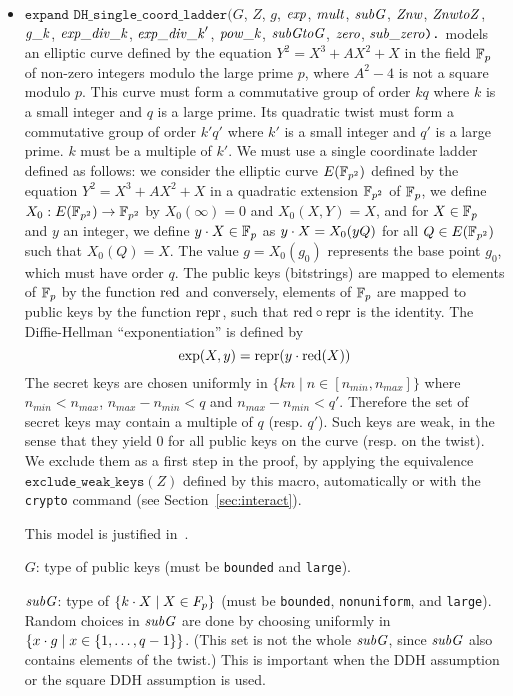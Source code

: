 \documentclass{article}
\begin{document}
\begin{itemize}
\begin{itemize}
\begin{itemize}
     \item $\texttt{expand\ DH\_single\_coord\_ladder}(G$, $Z$, $g$, $\mathit{exp}$, $\mathit{mult}$, $\mathit{subG}$, $\mathit{Znw}$, $\mathit{ZnwtoZ}$, $\mathit{g\_k}$, $\mathit{exp\_div\_k}$, $\mathit{exp\_div\_k}'$, $\mathit{pow\_k}$, $\mathit{subGtoG}$, $\mathit{zero}$, $\mathit{sub\_zero}\texttt{).}$ models an elliptic curve defined by the equation
   $Y^2 = X^3 + A X^2 + X$ in the field $\mathbb{F}_p$ of non-zero integers modulo the 
   large prime $p$, where $A^2 - 4$ is not a square modulo $p$.
   This curve must form a commutative group of order $kq$ where $k$ is a 
   small integer and $q$ is a large prime.
   Its quadratic twist must form a commutative group of order $k'q'$ where $k'$
   is a small integer and $q'$ is a large prime.
   $k$ must be a multiple of $k'$.
   We must use a single coordinate ladder defined as follows: we
   consider the elliptic curve $E(\mathbb{F}_{p^2})$ defined by the equation $Y^2 =
   X^3 + A X^2 + X$ in a quadratic extension $\mathbb{F}_{p^2}$ of $\mathbb{F}_p$, we define 
   $X_0 : E(\mathbb{F}_{p^2}) \rightarrow \mathbb{F}_{p^2}$ by $X_0(\infty) = 0$ and $X_0(X,Y) = X$, and 
   for $X \in \mathbb{F}_p$ and $y$ an integer, we define ${y}\cdot{X} \in \mathbb{F}_p$ as ${y}\cdot{X} = X_0(yQ)$
   for all $Q \in E(\mathbb{F}_{p^2})$ such that $X_0(Q) = X$.
   The value $g = X_0(g_0)$ represents the base point $g_0$, which must have order $q$.
   The public keys (bitstrings) are mapped to elements of $\mathbb{F}_p$ by the function 
   $\mathrm{red}$ and conversely, elements of $\mathbb{F}_p$ are mapped to public keys by
   the function $\mathrm{repr}$, such that $\mathrm{red} \circ \mathrm{repr}$ is the identity.
   The Diffie-Hellman ``exponentiation'' is defined by 
      \[\exp(X,y) = \mathrm{repr}({y}\cdot{\mathrm{red}(X)})\]
   The secret keys are chosen uniformly in $\{ kn \mid n \in [n_{min},n_{max}] \}$
   where $n_{min} < n_{max}$, $n_{max} - n_{min} < q$ and $n_{max} - n_{min} < q'$.
   Therefore the set of secret keys may contain a multiple of $q$ (resp. $q'$).
   Such keys are weak, in the sense that they yield 0 for all public
   keys on the curve (resp. on the twist). We exclude them as a first step
   in the proof, by applying the equivalence $\texttt{exclude\_weak\_keys}(Z)$
   defined by this macro, automatically or with the
   \texttt{crypto} command (see Section~\ref{sec:interact}).

This model is justified in~\cite{LippBlanchetBharagavanInria19}.

       $G$: type of public keys (must be \texttt{bounded} and \texttt{large}).

       $\mathit{subG}$: type of $\{ {k}\cdot{X} \mid X \in F_p \}$  (must be \texttt{bounded}, \texttt{nonuniform}, and \texttt{large}). 
     Random choices in $\mathit{subG}$ are done by choosing uniformly in 
     $\{ {x}\cdot{g} \mid x \in \{ 1, \dots, q-1 \} \}$. (This set is not the whole $\mathit{subG}$,
     since $\mathit{subG}$ also contains elements of the twist.)
     This is important when the DDH assumption or the square DDH assumption
     is used.
       


\end{itemize}
\end{itemize}
\end{itemize}
\end{document}
